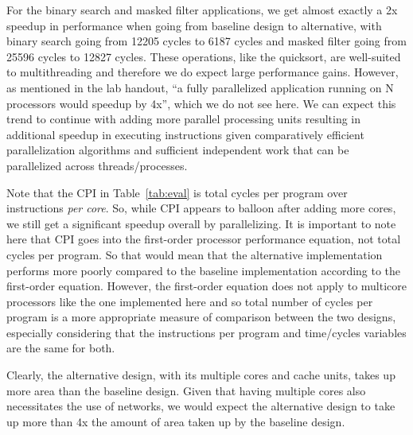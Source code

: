 \documentclass[10pt]{article}
\begin{document}
For the binary search and masked filter applications, we get almost exactly a 2x speedup in performance when going from baseline design to alternative, with binary search going from 12205 cycles to 6187 cycles and masked filter going from 25596 cycles to 12827 cycles. These operations, like the quicksort, are well-suited to multithreading and therefore we do expect large performance gains. However, as mentioned in the lab handout, ``a fully parallelized application running on N processors would speedup by 4x'', which we do not see here. We can expect this trend to continue with adding more parallel processing units resulting in additional speedup in executing instructions given comparatively efficient parallelization algorithms and sufficient independent work that can be parallelized across threads/processes. \par

Note that the CPI in Table~\ref{tab:eval} is total cycles per program over instructions \textit{per core}. So, while CPI appears to balloon after adding more cores, we still get a significant speedup overall by parallelizing. It is important to note here that CPI goes into the first-order processor performance equation, not total cycles per program. So that would mean that the alternative implementation performs more poorly compared to the baseline implementation according to the first-order equation. However, the first-order equation does not apply to multicore processors like the one implemented here and so total number of cycles per program is a more appropriate measure of comparison between the two designs, especially considering that the instructions per program and time/cycles variables are the same for both. \par

Clearly, the alternative design, with its multiple cores and cache units, takes up more area than the baseline design. Given that having multiple cores also necessitates the use of networks, we would expect the alternative design to take up more than 4x the amount of area taken up by the baseline design.
\end{document}
